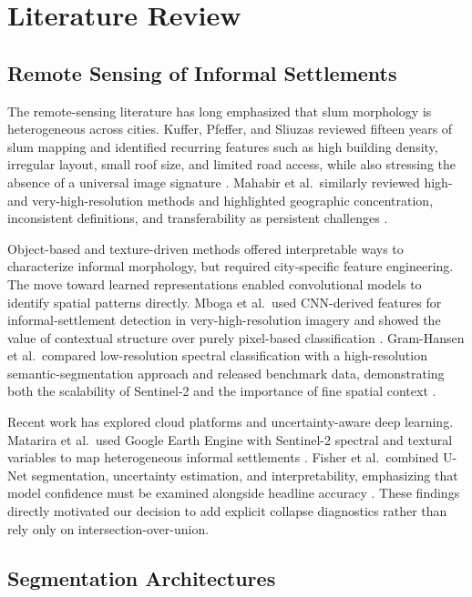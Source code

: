 \documentclass[11pt,a4paper]{article}
\begin{document}
\section{Literature Review}

\subsection{Remote Sensing of Informal Settlements}

The remote-sensing literature has long emphasized that slum morphology is heterogeneous across cities. Kuffer, Pfeffer, and Sliuzas reviewed fifteen years of slum mapping and identified recurring features such as high building density, irregular layout, small roof size, and limited road access, while also stressing the absence of a universal image signature \citep{kuffer2016slums}. Mahabir et al.\ similarly reviewed high- and very-high-resolution methods and highlighted geographic concentration, inconsistent definitions, and transferability as persistent challenges \citep{mahabir2018critical}.

Object-based and texture-driven methods offered interpretable ways to characterize informal morphology, but required city-specific feature engineering. The move toward learned representations enabled convolutional models to identify spatial patterns directly. Mboga et al.\ used CNN-derived features for informal-settlement detection in very-high-resolution imagery and showed the value of contextual structure over purely pixel-based classification \citep{mboga2017detection}. Gram-Hansen et al.\ compared low-resolution spectral classification with a high-resolution semantic-segmentation approach and released benchmark data, demonstrating both the scalability of Sentinel-2 and the importance of fine spatial context \citep{gramhansen2019mapping}.

Recent work has explored cloud platforms and uncertainty-aware deep learning. Matarira et al.\ used Google Earth Engine with Sentinel-2 spectral and textural variables to map heterogeneous informal settlements \citep{matarira2022gee}. Fisher et al.\ combined U-Net segmentation, uncertainty estimation, and interpretability, emphasizing that model confidence must be examined alongside headline accuracy \citep{fisher2022uncertainty}. These findings directly motivated our decision to add explicit collapse diagnostics rather than rely only on intersection-over-union.

\subsection{Segmentation Architectures}
\end{document}
